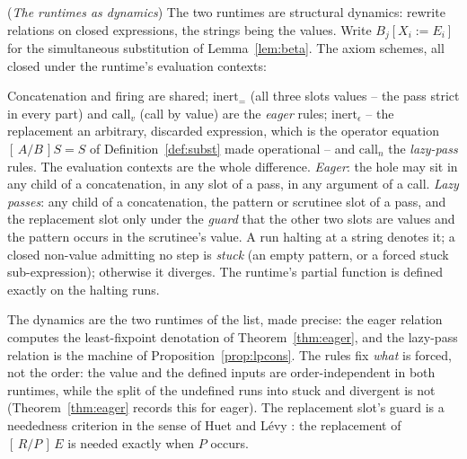 \documentclass[runningheads,envcountsect]{llncs}
\renewenvironment{remark}
  {\rmfamily\trivlist\item[\hskip\labelsep{\itshape Remark.}]\ignorespaces}
  {\endtrivlist}
\begin{document}
\begin{definition}
    (\emph{The runtimes as dynamics})
    \label{def:dynamics}
    The two runtimes are structural dynamics: rewrite relations on
    closed expressions, the strings being the values.  Write $B_j[X_i := E_i]$
    for the simultaneous substitution of Lemma~\ref{lem:beta}.  The axiom
    schemes, all closed under the runtime's evaluation contexts:
    Concatenation and firing are shared; $\mathrm{inert}_{=}$ (all three
    slots values -- the pass strict in every part) and $\mathrm{call}_{v}$
    (call by value) are the \emph{eager} rules;
    $\mathrm{inert}_{\epsilon}$ -- the replacement an arbitrary,
    discarded expression, which is the operator equation
    $[\,A/B\,]S = S$ of Definition~\ref{def:subst} made operational --
    and $\mathrm{call}_{n}$ the \emph{lazy-pass} rules.  The evaluation
    contexts are the whole difference.  \emph{Eager}: the hole may sit in
    any child of a concatenation, in any slot of a pass, in any argument
    of a call.  \emph{Lazy passes}: any child of a concatenation,
    the pattern or scrutinee slot of a pass, and the replacement slot
    only under the \emph{guard} that the other two slots are values and
    the pattern occurs in the scrutinee's value.  A run halting at a
    string denotes it; a closed non-value admitting no step is
    \emph{stuck} (an empty pattern, or a forced stuck sub-expression);
    otherwise it diverges.  The runtime's partial function is defined
    exactly on the halting runs.
\end{definition}

\begin{remark}
    \label{rem:dynamics}
    The dynamics are the two runtimes of the list, made precise: the
    eager relation computes the least-fixpoint denotation of
    Theorem~\ref{thm:eager}, and the
    lazy-pass relation is the machine of Proposition~\ref{prop:lpcons}.
    The rules fix \emph{what} is forced, not the order: the value and
    the defined inputs are order-independent in both runtimes, while
    the split of the undefined runs into stuck and divergent is not
    (Theorem~\ref{thm:eager} records this for eager).  The replacement
    slot's guard is a neededness criterion in the sense of Huet and
    L\'evy \cite{huetlevy79}: the replacement of $[\,R/P\,]\,E$ is needed
    exactly when $P$ occurs.
\end{remark}
\end{document}
